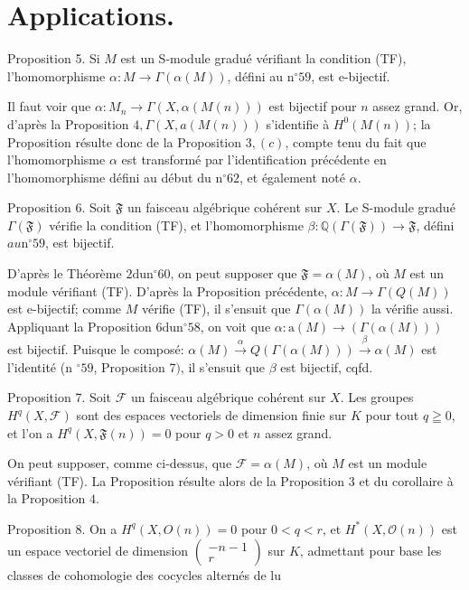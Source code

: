 \section{Applications.}

Proposition 5. Si $M$ est un S-module gradué vérifiant la condition (TF), l'homomorphisme $\alpha: M \rightarrow \Gamma(\alpha(M))$, défini au $\mathrm{n}^{\circ} 59$, est e-bijectif.

Il faut voir que $\alpha: M_{n} \rightarrow \Gamma(X, \alpha(M(n)))$ est bijectif pour $n$ assez grand. Or, d'après la Proposition $4, \Gamma(X, a(M(n)))$ s'identifie à $H^{0}(M(n))$; la Proposition résulte donc de la Proposition $3,(c)$, compte tenu du fait que l'homomorphisme $\alpha$ est transformé par l'identification précédente en l'homomorphisme défini au début du $\mathrm{n}^{\circ} 62$, et également noté $\alpha$.

Proposition 6. Soit $\mathfrak{F}$ un faisceau algébrique cohérent sur $X .$ Le S-module gradué $\Gamma(\mathfrak{F})$ vérifie la condition (TF), et l'homomorphisme $\beta: \mathbb{Q}(\Gamma(\mathfrak{F})) \rightarrow \mathfrak{F}$, défini $a u \mathrm{n}^{\circ} 59$, est bijectif.

D'après le Théorème $2 \mathrm{du} \mathrm{n}^{\circ} 60$, on peut supposer que $\mathfrak{F}=\alpha(M)$, où $M$ est un module vérifiant (TF). D'après la Proposition précédente, $\alpha: M \rightarrow \Gamma(Q(M))$ est e-bijectif; comme $M$ vérifie (TF), il s'ensuit que $\Gamma(\alpha(M))$ la vérifie aussi. Appliquant la Proposition $6 \mathrm{du} \mathrm{n}^{\circ} 58$, on voit que $\alpha: \mathrm{a}(M) \rightarrow \mathbb{}(\Gamma(\alpha(M)))$ est bijectif. Puisque le composé: $\alpha(M) \stackrel{\alpha}{\rightarrow} Q(\Gamma(\alpha(M))) \stackrel{\beta}{\rightarrow} \alpha(M)$ est l'identité (n ${ }^{\circ} 59$, Proposition 7$)$, il s'ensuit que $\beta$ est bijectif, cqfd.

Proposition 7. Soit $\mathcal{F}$ un faisceau algébrique cohérent sur $X .$ Les groupes $H^{q}(X, \mathcal{F})$ sont des espaces vectoriels de dimension finie sur $K$ pour tout $q \geqq 0$, et l'on a $H^{q}(X, \mathfrak{F}(n))=0$ pour $q>0$ et $n$ assez grand.

On peut supposer, comme ci-dessus, que $\mathcal{F}=\alpha(M)$, où $M$ est un module vérifiant (TF). La Proposition résulte alors de la Proposition 3 et du corollaire à la Proposition $4 .$

Proposition 8. On a $H^{q}(X, O(n))=0$ pour $0<q<r$, et $H^{*}(X, \mathcal{O}(n))$ est un espace vectoriel de dimension $\left(\begin{array}{c}-n-1 \\ r\end{array}\right)$ sur $K$, admettant pour base les classes de cohomologie des cocycles alternés de lu

